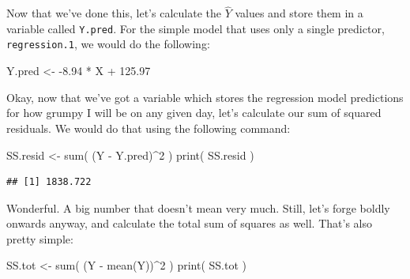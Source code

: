 \documentclass[
]{book}
\newenvironment{Shaded}{\begin{snugshade}}{\end{snugshade}}
\newcommand{\CommentTok}[1]{\textcolor[rgb]{0.56,0.35,0.01}{\textit{#1}}}
\newcommand{\DecValTok}[1]{\textcolor[rgb]{0.00,0.00,0.81}{#1}}
\newcommand{\FloatTok}[1]{\textcolor[rgb]{0.00,0.00,0.81}{#1}}
\newcommand{\FunctionTok}[1]{\textcolor[rgb]{0.00,0.00,0.00}{#1}}
\newcommand{\NormalTok}[1]{#1}
\newcommand{\OtherTok}[1]{\textcolor[rgb]{0.56,0.35,0.01}{#1}}
\newcommand{\SpecialCharTok}[1]{\textcolor[rgb]{0.00,0.00,0.00}{#1}}
\begin{document}
\begin{Shaded}
\end{Shaded}

Now that we've done this, let's calculate the \(\hat{Y}\) values and store them in a variable called \texttt{Y.pred}. For the simple model that uses only a single predictor, \texttt{regression.1}, we would do the following:

\begin{Shaded}
\begin{Highlighting}[]
\NormalTok{Y.pred }\OtherTok{\textless{}{-}} \SpecialCharTok{{-}}\FloatTok{8.94} \SpecialCharTok{*}\NormalTok{ X  }\SpecialCharTok{+}  \FloatTok{125.97}
\end{Highlighting}
\end{Shaded}

Okay, now that we've got a variable which stores the regression model predictions for how grumpy I will be on any given day, let's calculate our sum of squared residuals. We would do that using the following command:

\begin{Shaded}
\begin{Highlighting}[]
\NormalTok{SS.resid }\OtherTok{\textless{}{-}} \FunctionTok{sum}\NormalTok{( (Y }\SpecialCharTok{{-}}\NormalTok{ Y.pred)}\SpecialCharTok{\^{}}\DecValTok{2}\NormalTok{ )}
\FunctionTok{print}\NormalTok{( SS.resid )}
\end{Highlighting}
\end{Shaded}

\begin{verbatim}
## [1] 1838.722
\end{verbatim}

Wonderful. A big number that doesn't mean very much. Still, let's forge boldly onwards anyway, and calculate the total sum of squares as well. That's also pretty simple:

\begin{Shaded}
\begin{Highlighting}[]
\NormalTok{SS.tot }\OtherTok{\textless{}{-}} \FunctionTok{sum}\NormalTok{( (Y }\SpecialCharTok{{-}} \FunctionTok{mean}\NormalTok{(Y))}\SpecialCharTok{\^{}}\DecValTok{2}\NormalTok{ )}
\FunctionTok{print}\NormalTok{( SS.tot )}
\end{Highlighting}
\end{Shaded}
\end{document}
